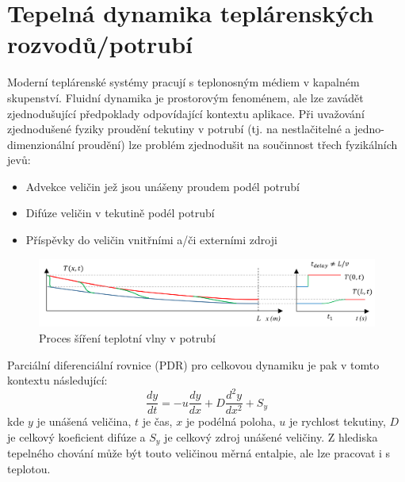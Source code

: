 \section{Tepelná dynamika teplárenských rozvodů/potrubí}
\label{sec:HeatDynamics}
Moderní teplárenské systémy pracují s teplonosným médiem v kapalném skupenství.
Fluidní dynamika je prostorovým fenoménem, ale lze zavádět zjednodušující
předpoklady odpovídající kontextu aplikace. Při uvažování zjednodušené fyziky
proudění tekutiny v potrubí (tj. na nestlačitelné a jedno-dimenzionální
proudění) lze problém zjednodušit na součinnost třech fyzikálních jevů:

\begin{itemize}
  \item Advekce veličin jež jsou unášeny proudem podél potrubí
  \item Difúze veličin v tekutině podél potrubí
  \item Příspěvky do veličin vnitřními a/či externími zdroji
\end{itemize}

\begin{figure}[h] \capstart
  \label{fig:heatwave}
  \includegraphics[width=\textwidth]{figures/heat_front}
  \caption{Proces šíření teplotní vlny v potrubí}
\end{figure}

Parciální diferenciální rovnice (PDR) pro celkovou dynamiku je pak v tomto
kontextu následující:
\begin{equation}
  \label{eq:AdvDiff}
  \frac{dy}{dt} = -u \frac{dy}{dx} + D\frac{d^{2}y}{dx^2} + {S_y}
\end{equation}
kde \(y\) je unášená veličina, \(t\) je čas, \(x\) je podélná poloha, \(u\) je
rychlost tekutiny, \(D\) je celkový koeficient difúze a \(S_y\) je celkový
zdroj unášené veličiny. Z hlediska tepelného chování může být touto veličinou
měrná entalpie, ale lze pracovat i s teplotou.

